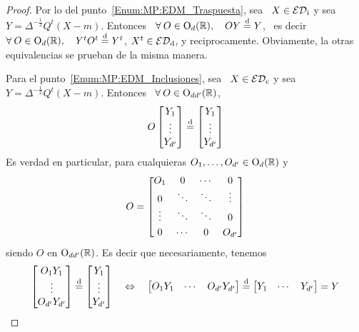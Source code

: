 \begin{proof}
%
  Por lo del punto~\ref{Enum:MP:EDM_Traspuesta}, sea \ $X \in \mathcal{ED}_{\mathrm{i}}$ y sea \
  $Y  =   \Delta^{-\frac12}  Q^t   (X-m)$.   Entonces  \   $\forall  \:   O  \in
  \mathrm{O}_d(\mathbb{R}),  \quad  O   Y  \stackrel{\mathrm{d}}{=}  Y$,  \  es  decir   $\forall  \:  O  \in
  \mathrm{O}_d(\mathbb{R}),  \quad  Y^t  O^t  \stackrel{\mathrm{d}}{=}   Y^t$,  \ie  $X^t  \in  \mathcal{ED}_{\mathrm{d}}$,  y
  reciprocamente.   Obviamente, la otras  equivalencias se  prueban de  la misma
  manera.

  Para el punto~\ref{Enum:MP:EDM_Inclusiones}, sea \ $X \in \mathcal{ED}_{\mathrm{c}}$ y sea \ $Y
  =   \Delta^{-\frac12}   Q^t   (X-m)$.    Entonces   \  $\forall   \:   O   \in
  \mathrm{O}_{dd'}(\mathbb{R})$,
  \[
  O \begin{bmatrix}  Y_1\\ \vdots\\ Y_{d'}  \end{bmatrix} \stackrel{\mathrm{d}}{=} \begin{bmatrix}
    Y_1 \\ \vdots \\ Y_{d'} \end{bmatrix}
  \]
  Es  verdad  en  particular,  para   cualquieras  $O_1,  \ldots  ,  O_{d'}  \in
  \mathrm{O}_d(\mathbb{R})$ y
  \[
  O = \begin{bmatrix}  O_1 & 0 & \cdots &  0 \\ 0 & \ddots &  \ddots & \vdots \\
    \vdots  &   \ddots  &  \ddots  &  \vspace{1mm}   0\\  0  &  \cdots   &  0  &
    O_{d'}\end{bmatrix}
  \]
  siendo $O$ en $\mathrm{O}_{dd'}(\mathbb{R})$. Es decir que necesariamente, tenemos
  \[
  \begin{bmatrix}    O_1   Y_1\\    \vdots\\    O_{d'}   Y_{d'}    \end{bmatrix}
  \stackrel{\mathrm{d}}{=}   \begin{bmatrix}  Y_1   \\  \vdots   \\  Y_{d'}   \end{bmatrix}  \quad
  \Leftrightarrow   \quad    \begin{bmatrix}   O_1   Y_1&    \cdots   &   O_{d'}
    Y_{d'}    \end{bmatrix}   \stackrel{\mathrm{d}}{=}    \begin{bmatrix}   Y_1    &    \cdots   &
    Y_{d'} \end{bmatrix} = Y
\]
\end{proof}
